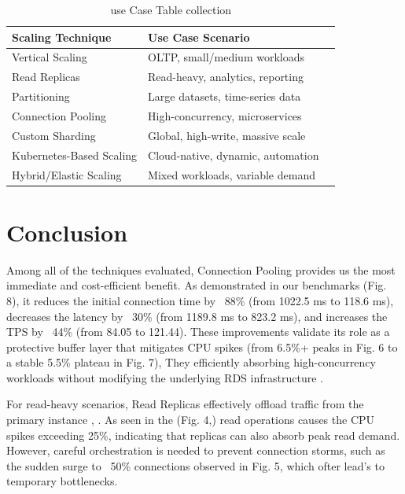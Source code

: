 \documentclass[conference]{IEEEtran}
\begin{document}
\begin{table}[htbp]
\centering
\small
\begin{tabular}{|p{2.4cm}|p{2.4cm}|p{2.4cm}|}
\hline
\textbf{Scaling Technique} & \textbf{Use Case Scenario} \\
\hline
Vertical Scaling & OLTP, small/medium workloads \\
\hline
Read Replicas & Read-heavy, analytics, reporting \\
\hline
Partitioning & Large datasets, time-series data \\
\hline
Connection Pooling & High-concurrency, microservices \\
\hline
Custom Sharding & Global, high-write, massive scale \\
\hline
Kubernetes-Based Scaling & Cloud-native, dynamic, automation \\
\hline
Hybrid/Elastic Scaling & Mixed workloads, variable demand \\
\hline
\end{tabular}
\caption{use Case Table collection}
\label{tab:postgresql_research_summary}
\end{table}

\section{Conclusion}
Among all of the techniques evaluated, Connection Pooling provides us the most immediate and cost-efficient benefit\cite{b13}. As demonstrated in our benchmarks (Fig. 8), it reduces the initial connection time by ~88\% (from 1022.5 ms to 118.6 ms), decreases the latency by ~30\% (from 1189.8 ms to 823.2 ms), and increases the TPS by ~44\% (from 84.05 to 121.44). These improvements validate its role as a protective buffer layer that mitigates CPU spikes (from 6.5\%+ peaks in Fig. 6 to a stable 5.5\% plateau in Fig. 7), They efficiently absorbing high-concurrency workloads without modifying the underlying RDS infrastructure \cite{b17}.

For read-heavy scenarios, Read Replicas effectively offload traffic from the primary instance \cite{b19}, \cite{b20}. As seen in the (Fig. 4,) read operations causes the CPU spikes exceeding 25\%, indicating that replicas can  also absorb peak read demand. However, careful orchestration is needed to prevent connection storms, such as the sudden surge to ~50\% connections observed in Fig. 5, which ofter lead's to temporary bottlenecks.
\end{document}
